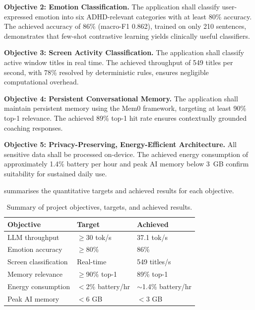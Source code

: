 \textbf{Objective 2: Emotion Classification.} The application shall classify user-expressed emotion into six ADHD-relevant categories with at least 80\% accuracy. The achieved accuracy of 86\% (macro-F1 0.862), trained on only 210 sentences, demonstrates that few-shot contrastive learning yields clinically useful classifiers.

\textbf{Objective 3: Screen Activity Classification.} The application shall classify active window titles in real time. The achieved throughput of 549 titles per second, with 78\% resolved by deterministic rules, ensures negligible computational overhead.

\textbf{Objective 4: Persistent Conversational Memory.} The application shall maintain persistent memory using the Mem0 framework, targeting at least 90\% top-1 relevance. The achieved 89\% top-1 hit rate ensures contextually grounded coaching responses.

\textbf{Objective 5: Privacy-Preserving, Energy-Efficient Architecture.} All sensitive data shall be processed on-device. The achieved energy consumption of approximately 1.4\% battery per hour and peak AI memory below 3~GB confirm suitability for sustained daily use.

 summarises the quantitative targets and achieved results for each objective.

\begin{table}[htbp]
  \centering
  \caption{Summary of project objectives, targets, and achieved results.}
  \label{tab:objectives-summary}
  \begin{tabular}{@{}lll@{}}
    \toprule
    \textbf{Objective}          & \textbf{Target}         & \textbf{Achieved}      \\
    \midrule
    LLM throughput              & $\geq$30 tok/s          & 37.1 tok/s             \\
    Emotion accuracy            & $\geq$80\%              & 86\%                   \\
    Screen classification       & Real-time               & 549 titles/s           \\
    Memory relevance            & $\geq$90\% top-1        & 89\% top-1             \\
    Energy consumption          & $<$2\% battery/hr       & $\sim$1.4\% battery/hr \\
    Peak AI memory              & $<$6 GB                 & $<$3 GB                \\
    \bottomrule
  \end{tabular}
\end{table}

